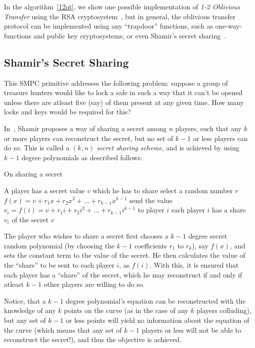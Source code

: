 In the algorithm~\ref{12ot}, we show one possible implementation of 
\emph{1-2 Oblivious Transfer} using the RSA cryptosystem~\cite{RSA78:AMfODSaPKC},
	but in general, the oblivious transfer protocol can be implemented using
	any ``trapdoor'' functions, such as one-way-functions and public key
	cryptosystems, or even Shamir's secret sharing~\cite{SSR08:APfGOT}.

\subsection{Shamir's Secret Sharing}
\label{sec:sss-prim}
This SMPC primitive addresses the following problem: suppose a group of
treasure hunters would like to lock a safe in such a way that it can't 
be opened unless there are atleast five (say) of them present at any given time. 
How many locks and keys would be required for this?

In~\cite{S79:HtSaS}, Shamir proposes a way of sharing a secret among $n$ 
players, such that any $k$ or more players can reconstruct the secret,
but no set of $k-1$ or less players can do so. This is called a $(k,n)$ 
{\it secret sharing scheme}, and is achieved by using $k-1$ degree polynomials
as described follows: 

\begin{algorithm}
\caption{On sharing a secret}
\label{algshare}
\begin{algorithmic}
\REQUIRE A player has a secret value $v$ which he has to share
\STATE select a random number $r$
\STATE $f(x) = v + r_{1}x + r_{2}x^{2} + \ldots + r_{k-1}x^{k-1}$
	\STATE send the value $v_{i}= f(i) = v + r_{1}i + r_{2}i^{2} + \ldots + r_{k-1}i^{k-1}$ to player $i$
\ENDFOR
\ENSURE each player $i$ has a share $v_{i}$ of the secret $v$
\end{algorithmic}
\end{algorithm}

The player who wishes to share a secret first chooses a $k-1$ degree
secret random polynomial (by choosing the $k-1$ coefficients $r_1$ to $r_k$),
say $f(x)$,
and sets the constant term to the value of the secret. He then calculates
the value of the ``share'' to be sent to each player $i$, as $f(i)$. With
this, it is ensured that each player has a ``share'' of the secret, which
he may reconstruct if and only if atleast $k-1$ other players are willing
to do so.

Notice, that
a $k-1$ degree polynomial's equation can be reconstructed with the knowledge
of any $k$ points on the curve (as in the case of any $k$ players colluding),
but any set of $k-1$ or less points will yield no information
about the equation of the curve (which means that any set of $k-1$ players
or less will not be able to reconstruct the secret!), and thus the objective
is achieved.

